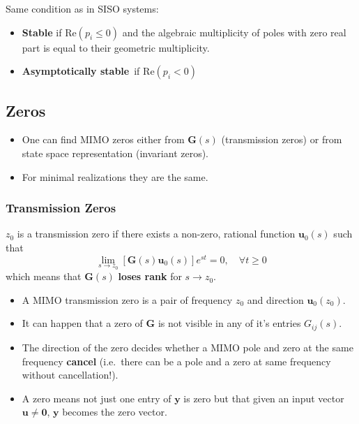 \newpar{}

Same condition as in SISO systems:
\begin{itemize}
    \item \textbf{Stable} if $\mathrm{Re}(p_i \le 0)$ and the algebraic multiplicity of poles with zero real part is equal to their geometric multiplicity.
    \item \textbf{Asymptotically stable}\ if $\mathrm{Re}(p_i<0)$
\end{itemize}


\subsection{Zeros}
\begin{itemize}
    \item One can find MIMO zeros either from $\mathbf{G}(s)$ (transmission zeros) or from state space representation (invariant zeros).
    \item For minimal realizations they are the same.
\end{itemize}

\subsubsection{Transmission Zeros}

$z_0$ is a transmission zero if there exists a non-zero, rational function $\mathbf{u}_0(s)$ such that
\begin{equation*}
    \lim_{s\to z_0}\left[\mathbf{G}(s)\mathbf{u}_0(s)\right]e^{st}=0,\quad\forall t\geq0
\end{equation*}
which means that $\mathbf{\mathbf{G}}(s)$ \textbf{loses rank} for $s\to z_0$.


\begin{itemize}
    \item A MIMO transmission zero is a pair of frequency $z_0$ and direction $\mathbf{u}_0(z_0)$.
    \item It can happen that a zero of $\mathbf{G}$ is not visible in any of it's entries $G_{ij}(s)$.
    \item The direction of the zero decides whether a MIMO pole and zero at the same frequency \textbf{cancel} (i.e.\ there can be a pole and a zero at same frequency without cancellation!).
    \item A zero means not just one entry of $\mathbf{y}$ is zero but that given an input vector $\mathbf{u} \ne \mathbf{0}$, $\mathbf{y}$ becomes the zero vector.
\end{itemize}

